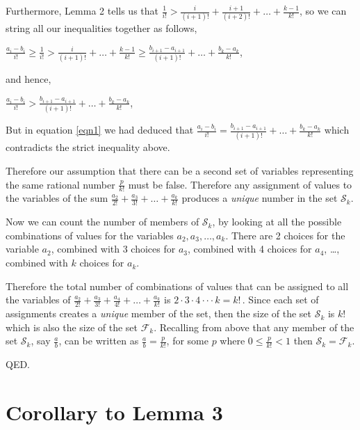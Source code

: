 \documentclass{article}
\begin{document}
Furthermore, Lemma 2 tells us that \(\frac{1}{i!} > 
\frac{i}{(i+1)!}
+ \frac{i+1}{(i+2)!}
+ \dots{} + \frac{k-1}{k!}\), so
we can string all our inequalities together as follows,

\begin{center}
\(\frac{a_i - b_i}{i!} \ge{} \frac{1}{i!} > \frac{i}{(i+1)!} + \dots{} + \frac{k-1}{k!} \ge{} \frac{b_{i+1} - a_{i+1}}{(i+1)!} + \dots{} + \frac{b_k - a_k}{k!}\),
\end{center}

and hence,

\begin{center}
\(\frac{a_i - b_i}{i!} > \frac{b_{i+1} - a_{i+1}}{(i+1)!} + \dots{} + \frac{b_k - a_k}{k!}\),
\end{center}

But in equation \eqref{eqn1} we had deduced
that \(\frac{a_i - b_i}{i!} = \frac{b_{i+1} - a_{i+1}}{(i+1)!} + \dots{} + \frac{b_k - a_k}{k!}\)
which contradicts the strict inequality above.

Therefore our assumption that there can be a second set
of variables representing the same rational number \(\frac{p}{k!}\) must be false.
Therefore any assignment of values to the variables of the sum
\(\frac{a_2}{2!} + \frac{a_3}{3!} + \dots{} + \frac{a_k}{k!}\)
produces a \emph{unique} number in the set \(\mathcal{S}_k\).

Now we can count the number of members of \(\mathcal{S}_k\), by looking at all the
possible combinations of values for the variables \(a_2, a_3, \dots{}, a_k\).
There are 2 choices for the variable \(a_2\),
combined with 3 choices for \(a_3\),
combined with 4 choices for \(a_4\),
\dots{},
combined with \(k\) choices for \(a_k\).

Therefore the total number of combinations of values
that can be assigned to all the variables of
\(\frac{a_2}{2!}
+ \frac{a_3}{3!}
+ \frac{a_4}{4!}
+ \dots{} + \frac{a_k}{k!}\)
is \(2\cdot{}3\cdot{}4\cdot\cdot{}\cdot{}k = k!\,\). Since each set of assignments 
creates a \emph{unique} member of the set, then the size of the set \(\mathcal{S}_k\) is \(k!\)
which is also the size of the set \(\mathcal{F}_k\).
Recalling from above that any 
member of the set \(\mathcal{S}_k\), say \(\frac{a}{b}\),
can be written as \(\frac{a}{b} = \frac{p}{k!}\), for some \(p\) where 
\(0\le{}\frac{p}{k!}<1\) then
\(\mathcal{S}_k = \mathcal{F}_k\).

QED.

\section*{Corollary to Lemma 3}
\end{document}
